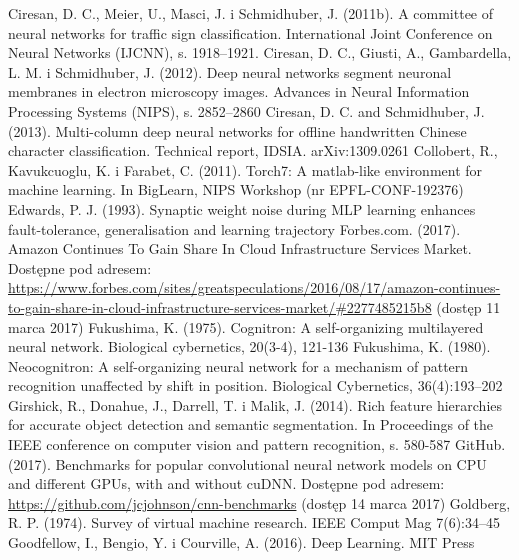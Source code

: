 \documentclass[12pt,a4paper,twoside]{article}
\begin{document}
\begin{thebibliography}{99}
 Ciresan, D. C., Meier, U., Masci, J. i Schmidhuber, J. (2011b). A committee of neural networks for traffic sign classification. International Joint Conference on Neural Networks (IJCNN), s. 1918–1921.
 Ciresan, D. C., Giusti, A., Gambardella, L. M. i Schmidhuber, J. (2012). Deep neural networks segment neuronal membranes in electron microscopy images. Advances in Neural Information Processing Systems (NIPS), s. 2852–2860
 Ciresan, D. C. and Schmidhuber, J. (2013). Multi-column deep neural networks for offline handwritten Chinese character classification. Technical report, IDSIA. arXiv:1309.0261
 Collobert, R., Kavukcuoglu, K. i Farabet, C. (2011). Torch7: A matlab-like environment for machine learning. In BigLearn, NIPS Workshop (nr EPFL-CONF-192376)
 Edwards, P. J. (1993). Synaptic weight noise during MLP learning enhances fault-tolerance, generalisation and learning trajectory
 Forbes.com. (2017). Amazon Continues To Gain Share In Cloud Infrastructure Services Market. Dostępne pod adresem: \url{https://www.forbes.com/sites/greatspeculations/2016/08/17/amazon-continues-to-gain-share-in-cloud-infrastructure-services-market/#2277485215b8} (dostęp 11 marca 2017)
 Fukushima, K. (1975). Cognitron: A self-organizing multilayered neural network. Biological cybernetics, 20(3-4), 121-136
 Fukushima, K. (1980). Neocognitron: A self-organizing neural network for a mechanism of pattern recognition unaffected by shift in position. Biological Cybernetics, 36(4):193–202
 Girshick, R., Donahue, J., Darrell, T. i Malik, J. (2014). Rich feature hierarchies for accurate object detection and semantic segmentation. In Proceedings of the IEEE conference on computer vision and pattern recognition, s. 580-587
 GitHub. (2017). Benchmarks for popular convolutional neural network models on CPU and different GPUs, with and without cuDNN. Dostępne pod adresem: \url{https://github.com/jcjohnson/cnn-benchmarks} (dostęp 14 marca 2017)
 Goldberg, R. P. (1974). Survey of virtual machine research. IEEE Comput Mag 7(6):34–45
 Goodfellow, I., Bengio, Y. i Courville, A. (2016). Deep Learning. MIT Press

\end{thebibliography}
\end{document}
